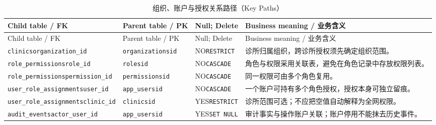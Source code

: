 \begingroup\footnotesize\setlength{\tabcolsep}{3pt}
\begin{longtable}{@{}L{43mm}L{32mm}L{24mm}L{49mm}@{}}
\caption{组织、账户与授权关系路径（Key Paths）}\label{tab:domain-key-01}\\\toprule
Child table / FK & Parent table / PK & Null; Delete & Business meaning / 业务含义\\\midrule\endfirsthead
\toprule Child table / FK & Parent table / PK & Null; Delete & Business meaning / 业务含义\\\midrule\endhead
\texttt{clinics}\newline\texttt{organization\_id} & \texttt{organizations}\newline\texttt{id} & NO\newline\texttt{RESTRICT} & 诊所归属组织，跨诊所授权须先确定组织范围。\\
\texttt{role\_permissions}\newline\texttt{role\_id} & \texttt{roles}\newline\texttt{id} & NO\newline\texttt{CASCADE} & 角色与权限采用关联表，避免在角色记录中存放权限列表。\\
\texttt{role\_permissions}\newline\texttt{permission\_id} & \texttt{permissions}\newline\texttt{id} & NO\newline\texttt{CASCADE} & 同一权限可由多个角色复用。\\
\texttt{user\_role\_assignments}\newline\texttt{user\_id} & \texttt{app\_users}\newline\texttt{id} & NO\newline\texttt{CASCADE} & 一个账户可持有多个角色授权，授权本身可独立留痕。\\
\texttt{user\_role\_assignments}\newline\texttt{clinic\_id} & \texttt{clinics}\newline\texttt{id} & YES\newline\texttt{RESTRICT} & 诊所范围可选；不应把空值自动解释为全网权限。\\
\texttt{audit\_events}\newline\texttt{actor\_user\_id} & \texttt{app\_users}\newline\texttt{id} & YES\newline\texttt{SET NULL} & 审计事实与操作账户关联；账户停用不能抹去历史事件。\\
\bottomrule\end{longtable}\endgroup


